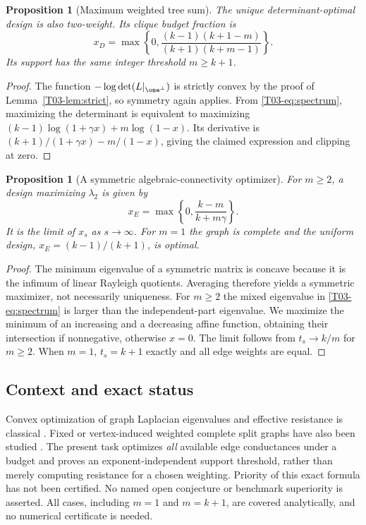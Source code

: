 \documentclass[11pt,a4paper]{article}
\newtheorem{proposition}[theorem]{Proposition}
\theoremstyle{definition}\newtheorem{definition}[theorem]{Definition}
\theoremstyle{remark}\newtheorem{remark}[theorem]{Remark}
\numberwithin{equation}{section}
\begin{document}
\begin{proposition}[Maximum weighted tree sum]
The unique determinant-optimal design is also two-weight. Its clique budget fraction is
\[
 x_D=\max\left\{0,\frac{(k-1)(k+1-m)}{(k+1)(k+m-1)}\right\}.
\]
Its support has the same integer threshold $m\ge k+1$.
\end{proposition}
\begin{proof}
The function $-\log\det(L|_{\one^\perp})$ is strictly convex by the proof of Lemma~\ref{T03-lem:strict}, so symmetry again applies. From \eqref{T03-eq:spectrum}, maximizing the determinant is equivalent to maximizing
$(k-1)\log(1+\gamma x)+m\log(1-x)$. Its derivative is
$(k+1)/(1+\gamma x)-m/(1-x)$, giving the claimed expression and clipping at zero.
\end{proof}
\begin{proposition}[A symmetric algebraic-connectivity optimizer]
For $m\ge2$, a design maximizing $\lambda_2$ is given by
\[
 x_E=\max\left\{0,\frac{k-m}{k+m\gamma}\right\}.
\]
It is the limit of $x_s$ as $s\to\infty$. For $m=1$ the graph is complete and the uniform design, $x_E=(k-1)/(k+1)$, is optimal.
\end{proposition}
\begin{proof}
The minimum eigenvalue of a symmetric matrix is concave because it is the infimum of linear Rayleigh quotients. Averaging therefore yields a symmetric maximizer, not necessarily uniqueness. For $m\ge2$ the mixed eigenvalue in \eqref{T03-eq:spectrum} is larger than the independent-part eigenvalue. We maximize the minimum of an increasing and a decreasing affine function, obtaining their intersection if nonnegative, otherwise $x=0$. The limit follows from $t_s\to k/m$ for $m\ge2$. When $m=1$, $t_s=k+1$ exactly and all edge weights are equal.
\end{proof}

\subsection{Context and exact status}\label{T03-sec-5}
Convex optimization of graph Laplacian eigenvalues and effective resistance is classical \cite{ref039,ref036}. Fixed or vertex-induced weighted complete split graphs have also been studied \cite{ref041}. The present task optimizes \emph{all} available edge conductances under a budget and proves an exponent-independent support threshold, rather than merely computing resistance for a chosen weighting. Priority of this exact formula has not been certified. No named open conjecture or benchmark superiority is asserted. All cases, including $m=1$ and $m=k+1$, are covered analytically, and no numerical certificate is needed.
\end{document}
